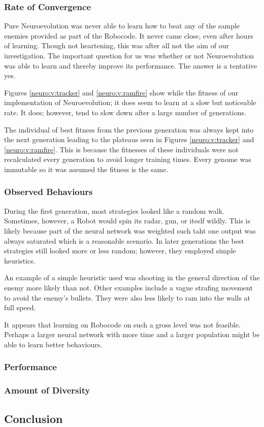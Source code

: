 \subsubsection{Rate of Convergence}
Pure Neuroevolution was never able to learn how to beat any of the sample enemies provided as part of the Robocode. It never came close, even after hours of learning. Though not heartening, this was after all not the aim of our investigation. The important question for us was whether or not Neuroevolution was able to learn and thereby improve its performance. The answer is a tentative yes.

Figures \ref{neuro:v:tracker} and \ref{neuro:v:ramfire} show while the fitness of our implementation of Neuroevolution; it does seem to learn at a slow but noticeable rate. It does; however, tend to slow down after a large number of generations. 

The individual of best fitness from the previous generation was always kept into the next generation leading to the plateaus seen in Figures \ref{neuro:v:tracker} and \ref{neuro:v:ramfire}. This is because the fitnesses of these individuals were not recalculated every generation to avoid longer training times. Every genome was immutable so it was assumed the fitness is the same.

\subsubsection{Observed Behaviours}
During the first generation, most strategies looked like a random walk. Sometimes, however, a Robot would spin its radar, gun, or iteslf wildly. This is likely because part of the neural network was weighted such taht one output was always saturated which is a reasonable scenario. In later generations the best strategies still looked more or less random; however, they employed simple heuristics.

An example of a simple heuristic used was shooting in the general direction of the enemy more likely than not. Other examples include a vague strafing movement to avoid the enemy's bullets. They were also less likely to ram into the walls at full speed.

It appears that learning on Robocode on such a gross level was not feasible. Perhaps a larger neural network with more time and a larger population might be able to learn better behaviours.


\FigNeurovTracker
\FigNeurovRamFire

\subsubsection{Performance}
\subsubsection{Amount of Diversity}

\subsection{Conclusion}
